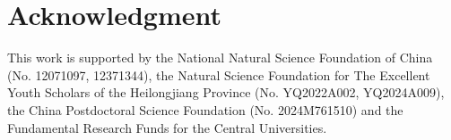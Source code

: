 \documentclass{article}
\newtheorem{con}[thm]{Conjecture}
\begin{document}



\section*{Acknowledgment}

This work is supported by the National Natural Science Foundation of China (No. 12071097, 12371344),
the Natural Science Foundation for The Excellent Youth Scholars of the Heilongjiang Province (No. YQ2022A002, YQ2024A009),
the China Postdoctoral Science Foundation (No. 2024M761510) and the Fundamental Research Funds for the Central Universities.











\end{document}
